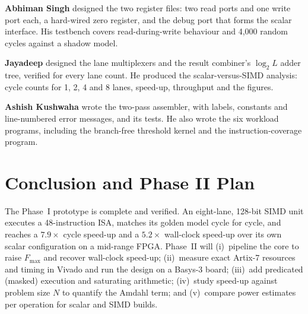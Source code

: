 \documentclass[conference]{IEEEtran}
\begin{document}
\textbf{Abhiman Singh} designed the two register files: two read ports and one
write port each, a hard-wired zero register, and the debug port that forms the
scalar interface. His testbench covers read-during-write behaviour and 4,000 random
cycles against a shadow model.

\textbf{Jayadeep} designed the lane multiplexers and the result combiner's
$\log_2 L$ adder tree, verified for every lane count. He produced the
scalar-versus-SIMD analysis: cycle counts for 1, 2, 4 and 8 lanes, speed-up,
throughput and the figures.

\textbf{Ashish Kushwaha} wrote the two-pass assembler, with labels, constants and
line-numbered error messages, and its tests. He also wrote the six workload programs,
including the branch-free threshold kernel and the instruction-coverage program.

\section{Conclusion and Phase II Plan}
The Phase~I prototype is complete and verified. An eight-lane, 128-bit SIMD unit
executes a 48-instruction ISA, matches its golden model cycle for cycle, and reaches
a $7.9\times$ cycle speed-up and a $5.2\times$ wall-clock speed-up over its own
scalar configuration on a mid-range FPGA. Phase~II will
(i)~pipeline the core to raise $F_{\max}$ and recover wall-clock speed-up;
(ii)~measure exact Artix-7 resources and timing in Vivado and run the design on a
Basys-3 board;
(iii)~add predicated (masked) execution and saturating arithmetic;
(iv)~study speed-up against problem size $N$ to quantify the Amdahl term; and
(v)~compare power estimates per operation for scalar and SIMD builds.
\end{document}

